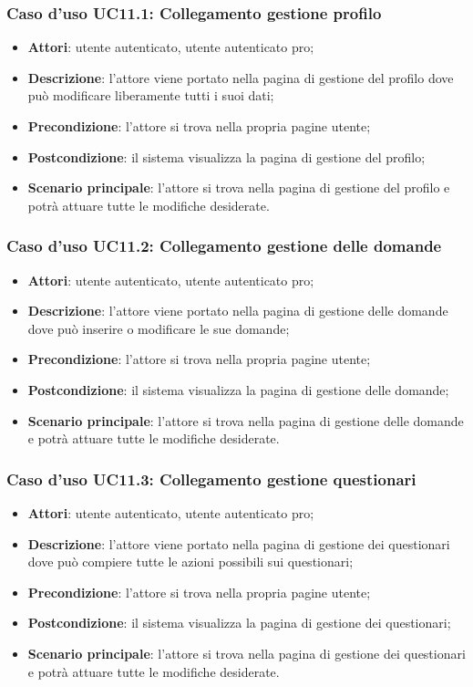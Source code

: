 \subsubsection{Caso d'uso UC11.1: Collegamento gestione profilo}
\begin{itemize}
\item\textbf{Attori}: utente autenticato, utente autenticato pro;
\item\textbf{Descrizione}: l'attore viene portato nella pagina di gestione del profilo dove può modificare liberamente tutti i suoi dati;
\item\textbf{Precondizione}: l'attore si trova nella propria pagine utente;
\item\textbf{Postcondizione}: il sistema visualizza la pagina di gestione del profilo;
\item\textbf{Scenario principale}: l'attore si trova nella pagina di gestione del profilo e potrà attuare tutte le modifiche desiderate.
\end{itemize}

\subsubsection{Caso d'uso UC11.2: Collegamento gestione delle domande}
\begin{itemize}
\item\textbf{Attori}: utente autenticato, utente autenticato pro;
\item\textbf{Descrizione}: l'attore viene portato nella pagina di gestione delle domande dove può inserire o modificare le sue domande;
\item\textbf{Precondizione}: l'attore si trova nella propria pagine utente;
\item\textbf{Postcondizione}: il sistema visualizza la pagina di gestione delle domande;
\item\textbf{Scenario principale}: l'attore si trova nella pagina di gestione delle domande e potrà attuare tutte le modifiche desiderate.
\end{itemize}

\subsubsection{Caso d'uso UC11.3: Collegamento gestione questionari}
\begin{itemize}
\item\textbf{Attori}: utente autenticato, utente autenticato pro;
\item\textbf{Descrizione}: l'attore viene portato nella pagina di gestione dei questionari dove può compiere tutte le azioni possibili sui questionari;
\item\textbf{Precondizione}: l'attore si trova nella propria pagine utente;
\item\textbf{Postcondizione}: il sistema visualizza la pagina di gestione dei questionari;
\item\textbf{Scenario principale}: l'attore si trova nella pagina di gestione dei questionari e potrà attuare tutte le modifiche desiderate.
\end{itemize}


